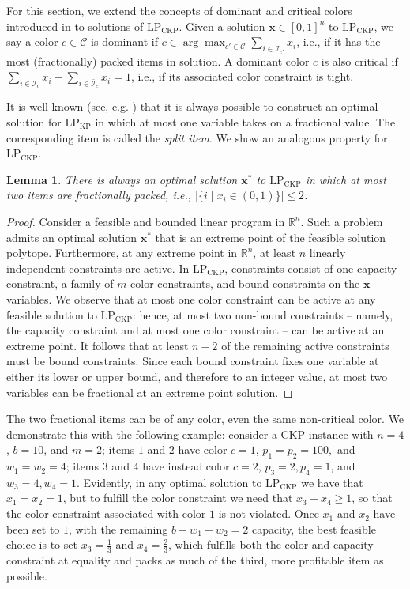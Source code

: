 \documentclass[preprint,11pt]{elsarticle}
\newcommand{\items}{\mathcal{I}}
\newcommand{\colors}{\mathcal{C}}
\newcommand{\profit}{p}
\newcommand{\weight}{w}
\newcommand{\capacity}{b}
\newcommand{\bx}{\boldsymbol{x}}
\newcommand{\ckpLP}{\text{LP}_\text{CKP}}
\newcommand{\kpLP}{\text{LP}_\text{KP}}
\newtheorem{lemma}{Lemma}%
\theoremstyle{definition}
\begin{document}
For this section, we extend the concepts of dominant and critical colors introduced in  to solutions of $\ckpLP$. 
Given a solution $\boldsymbol{x} \in [0,1]^n$ to $\ckpLP$, we say a color $c \in \colors$ is dominant if $c \in \arg\max_{c' \in \colors}\sum_{i \in \items_{c'}}x_i$, i.e., if it has the most (fractionally) packed items in solution.
A dominant color $c$ is also critical if $\sum_{i \in \items_c}x_i - \sum_{i \in \bar{\items}_c}x_i = 1$, i.e., if its associated color constraint is tight.

It is well known (see, e.g. \cite{KPP04li}) that it is always possible to construct an optimal solution for $\kpLP$ in which at most one variable takes on a fractional value.
The corresponding item is called the \textit{split item}.
We show an analogous property for $\ckpLP$.
\begin{lemma}\label{lemma:twofracitems}
    There is always an optimal solution $\bx^*$ to $\ckpLP$ in which at most two items are fractionally packed, i.e., \( \big|\{i \mid x_i \in (0,1)\} \big| \leq 2\). 
\end{lemma}
\begin{proof} 
    Consider a feasible and bounded linear program in \( \mathbb{R}^n \).
    Such a problem admits an optimal solution \( \bx^* \) that is an extreme point of the feasible solution polytope.
    Furthermore, at any extreme point in \( \mathbb{R}^n \), at least \( n \) linearly independent constraints are active.
    In $\ckpLP$, constraints consist of one capacity constraint, a family of $m$ color constraints, and bound constraints on the $\bx$ variables.
    We observe that at most one color constraint can be active at any feasible solution to $\ckpLP$: hence, at most two non-bound constraints -- namely, the capacity constraint and at most one color constraint -- can be active at an extreme point.
    It follows that at least  $n - 2$ of the remaining active constraints must be bound constraints.
    Since each bound constraint fixes one variable at either its lower or upper bound, and therefore to an integer value, at most two variables can be fractional at an extreme point solution.
\end{proof}

The two fractional items can be of any color, even the same non-critical color.
We demonstrate this with the following example: consider a CKP instance with \(n = 4\), \(\capacity = 10\), and $m=2$; items $1$ and $2$ have color $c=1$, \(\profit_1 = \profit_2 = 100,\) and \(\weight_1 = \weight_2 =4\); items $3$ and $4$ have instead color $c=2$, $\profit_3 = 2, \profit_4 = 1$, and $\weight_3 = 4, \weight_4 = 1$.
Evidently, in any optimal solution to $\ckpLP$ we have that $x_1=x_2=1$, but to fulfill the color constraint we need that $x_3+x_4 \geq 1$, so that the color constraint associated with color $1$ is not violated. 
Once $x_1$ and $x_2$ have been set to $1$, with the remaining $\capacity -\weight_1 -\weight_2 = 2$ capacity, the best feasible choice is to set $x_3 = \frac{1}{3}$ and $x_4 = \frac{2}{3}$, which fulfills both the color and capacity constraint at equality and packs as much of the third, more profitable item as possible.
\end{document}
